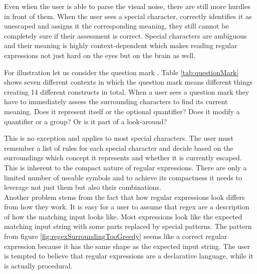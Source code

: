 Even when the user is able to parse the visual noise, there are still more hurdles in front of them. When the user sees a special character, correctly identifies it as unescaped and assigns it the corresponding meaning, they still cannot be completely sure if their assessment is correct. Special characters are ambiguous and their meaning is highly context-dependent which makes reading regular expressions not just hard on the eyes but on the brain as well.

For illustration let us consider the question mark . Table \ref{tab:questionMark} shows seven different contexts in which the question mark means different things creating 14 different constructs in total. When a user sees a question mark they have to immediately assess the surrounding characters to find its current meaning. Does it represent itself or the optional quantifier? Does it modify a quantifier or a group? Or is it part of a look-around? 

This is no exception and applies to most special characters. The user must remember a list of rules for each special character and decide based on the surroundings which concept it represents and whether it is currently escaped. This is inherent to the compact nature of regular expressions. There are only a limited number of useable symbols and to achieve its compactness it needs to leverage not just them but also their combinations. \\

Another problem stems from the fact that how regular expressions look differs from how they work. It is easy for a user to assume that regex are a description of how the matching input looks like. Most expressions look like the expected matching input string with some parts replaced by special patterns. The pattern  from figure \ref{fig:regexSurroundingTooGreedy} seems like a correct regular expression because it has the same shape as the expected input string. The user is tempted to believe that regular expressions are a declarative language, while it is actually procedural. 

